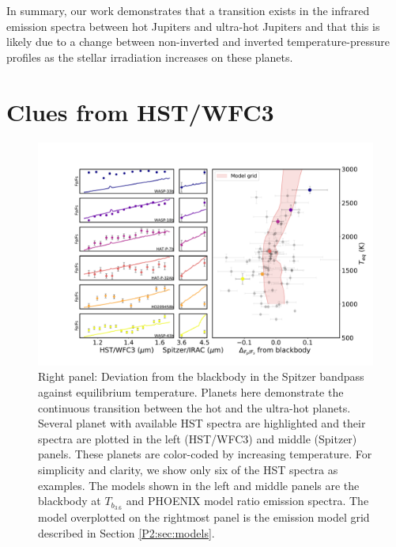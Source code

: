 In summary, our work demonstrates that a transition exists in the infrared emission spectra between hot Jupiters and ultra-hot Jupiters and that this is likely due to a change between non-inverted and inverted temperature-pressure profiles as the stellar irradiation increases on these planets.

\section{Clues from HST/WFC3}
\label{P2:app:HST}

\begin{figure}
    \centering
    \includegraphics[trim={3.5cm 1cm 0cm 1cm},clip,width=\textwidth]{devBBandHST_Teq_selection.pdf}
    \caption{Right  panel: Deviation from the blackbody in the Spitzer bandpass against equilibrium temperature. Planets here demonstrate the continuous transition between the hot and the ultra-hot planets. Several planet with available HST spectra are highlighted and their spectra are plotted in the left   (HST/WFC3) and middle (Spitzer) panels. These planets are color-coded by increasing temperature. For simplicity and clarity, we show only six of the HST spectra as examples. The models shown in the left and middle panels are the blackbody at $T_{b_{3.6}}$ and PHOENIX model ratio emission spectra. The model overplotted on the rightmost panel is the emission model grid described in Section \ref{P2:sec:models}.}
    \label{P2:fig:devBBHST}
\end{figure}

